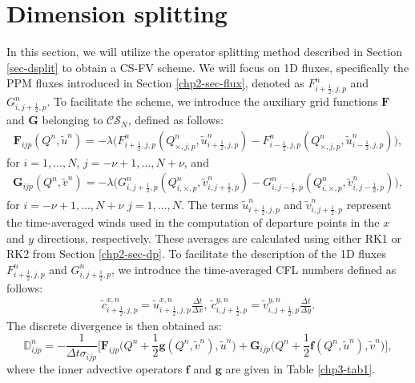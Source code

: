 \section{Dimension splitting}
\label{sec-csdsplit}
In this section, we will utilize the operator splitting method described in Section \ref{sec-dsplit} 
to obtain a CS-FV scheme.
We will focus on 1D fluxes, specifically the PPM fluxes introduced in Section \ref{chp2-sec-flux},
denoted as ${F}_{i+\frac{1}{2},j,p}^n$ and ${G}_{i,j+\frac{1}{2},p}^n$.
To facilitate the scheme, we introduce the auxiliary grid functions $\mathbf{F}$ and $\mathbf{G}$ belonging to $\mathcal{CS}_{N}$, defined as follows:
\begin{align*}
	\mathbf{F}_{ijp}({Q^n,\tilde{u}^n}) = -{\lambda} \bigg({F}_{i+\frac{1}{2},j,p}^n(Q^n_{\times,j,p},\tilde{u}^n_{i+\frac{1}{2},j,p})-
	{F}_{i-\frac{1}{2},j,p}^n(Q^n_{\times,j,p},\tilde{u}^n_{i-\frac{1}{2},j,p}) \bigg),
\end{align*}
for $i=1, \ldots, N$, $j=-\nu+1, \ldots, N + \nu$, and
\begin{align*}
	\mathbf{G}_{ijp}({Q^n,\tilde{v}^n}) = -{\lambda} \bigg({G}_{i,j+\frac{1}{2},p}^n(Q^n_{i,\times,p},\tilde{v}^n_{i,j+\frac{1}{2},p})-
	{G}_{i,j-\frac{1}{2},p}^n(Q^n_{i,\times,p},\tilde{v}^n_{i,j-\frac{1}{2},p}) \bigg),
\end{align*}
for $i=-\nu+1, \ldots, N + \nu$  $j=1, \ldots, N$.
The terms $\tilde{u}^n_{i+\frac{1}{2},j,p}$ and $\tilde{v}^n_{i,j+\frac{1}{2},p}$ represent the 
time-averaged winds used in the computation of departure points in the $x$ and $y$ directions, respectively. 
These averages are calculated using either RK1 or RK2 from Section \ref{chp2-sec-dp}. 
To facilitate the description of the 1D fluxes ${F}_{i+\frac{1}{2},j,p}^n$ and ${G}_{i,j+\frac{1}{2},p}^n$, 
we introduce the time-averaged CFL numbers defined as follows:
\begin{align*}
	\tilde{c}_{i+\frac{1}{2},j,p}^{x,n} = \tilde{u}_{i+\frac{1}{2},j,p}^{x,n}\frac{\Delta t}{\Delta x},\
	\tilde{c}_{i,j+\frac{1}{2},p}^{y,n} = \tilde{v}_{i,j+\frac{1}{2},p}^{y,n}\frac{\Delta t}{\Delta y}.
\end{align*}
The discrete divergence is then obtained as:
\begin{equation}
	\label{eqdiv-split}
	\mathbb{D}^n_{ijp} = -\frac{1}{\Delta t \sigma_{ijp}}
	\bigg[
	\mathbf{F}_{ijp}\bigg(Q^n + \frac{1}{2}\mathbf{g}(Q^n,\tilde{v}^n), \tilde{u}^n \bigg) 
	+\mathbf{G}_{ijp}\bigg(Q^n + \frac{1}{2}\mathbf{f}(Q^n,\tilde{u}^n), \tilde{v}^n \bigg) \bigg],
\end{equation}
where the inner advective operators $\mathbf{f}$ and $\mathbf{g}$ are given in Table \ref{chp3-tab1}.

